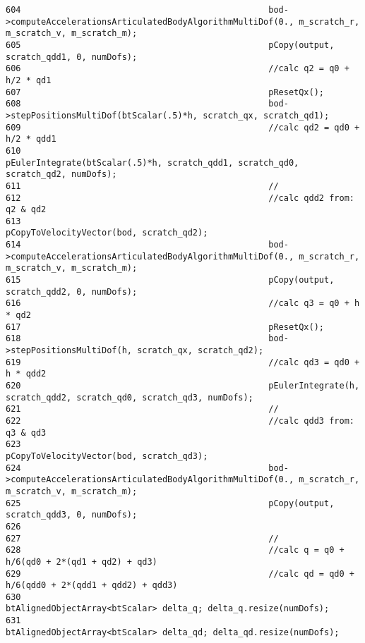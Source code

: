 \begin{Code}
\begin{verbatim}
604                                                 bod->computeAccelerationsArticulatedBodyAlgorithmMultiDof(0., m_scratch_r, m_scratch_v, m_scratch_m);
605                                                 pCopy(output, scratch_qdd1, 0, numDofs);
606                                                 //calc q2 = q0 + h/2 * qd1
607                                                 pResetQx();
608                                                 bod->stepPositionsMultiDof(btScalar(.5)*h, scratch_qx, scratch_qd1);
609                                                 //calc qd2 = qd0 + h/2 * qdd1
610                                                 pEulerIntegrate(btScalar(.5)*h, scratch_qdd1, scratch_qd0, scratch_qd2, numDofs);
611                                                 //
612                                                 //calc qdd2 from: q2 & qd2
613                                                 pCopyToVelocityVector(bod, scratch_qd2);
614                                                 bod->computeAccelerationsArticulatedBodyAlgorithmMultiDof(0., m_scratch_r, m_scratch_v, m_scratch_m);
615                                                 pCopy(output, scratch_qdd2, 0, numDofs);
616                                                 //calc q3 = q0 + h * qd2
617                                                 pResetQx();
618                                                 bod->stepPositionsMultiDof(h, scratch_qx, scratch_qd2);
619                                                 //calc qd3 = qd0 + h * qdd2
620                                                 pEulerIntegrate(h, scratch_qdd2, scratch_qd0, scratch_qd3, numDofs);
621                                                 //
622                                                 //calc qdd3 from: q3 & qd3
623                                                 pCopyToVelocityVector(bod, scratch_qd3);
624                                                 bod->computeAccelerationsArticulatedBodyAlgorithmMultiDof(0., m_scratch_r, m_scratch_v, m_scratch_m);
625                                                 pCopy(output, scratch_qdd3, 0, numDofs);
626 
627                                                 //
628                                                 //calc q = q0 + h/6(qd0 + 2*(qd1 + qd2) + qd3)
629                                                 //calc qd = qd0 + h/6(qdd0 + 2*(qdd1 + qdd2) + qdd3)                                            
630                                                 btAlignedObjectArray<btScalar> delta_q; delta_q.resize(numDofs);
631                                                 btAlignedObjectArray<btScalar> delta_qd; delta_qd.resize(numDofs);

\end{verbatim}
\end{Code}
